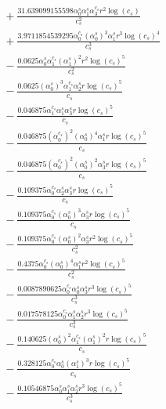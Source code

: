 \documentclass[10pt]{article}
\begin{document}
\begin{align*}
&{}  + \frac{31.639099155598 \alpha_{0}^s \alpha_{1}^s \alpha_{3}^{c_s} r^{2} \log{\left(c_{s} \right)}}{c_{s}^{2}} \\
&{}  + \frac{3.9711854539295 \alpha_{0}^{c_s} \left(\alpha_{0}^s\right)^{3} \alpha_{1}^s r^{3} \log{\left(c_{s} \right)}^{4}}{c_{s}^{3}} \\
&{}  - \frac{0.0625 \alpha_{0}^s \alpha_{1}^{c_s} \left(\alpha_{1}^s\right)^{2} r^{2} \log{\left(c_{s} \right)}^{5}}{c_{s}^{2}} \\
&{}  - \frac{0.0625 \left(\alpha_{0}^s\right)^{3} \alpha_{1}^{c_s} \alpha_{2}^s r \log{\left(c_{s} \right)}^{5}}{c_{s}} \\
&{}  - \frac{0.046875 \alpha_{1}^{c_s} \alpha_{1}^s \alpha_{3}^s r \log{\left(c_{s} \right)}^{5}}{c_{s}} \\
&{}  - \frac{0.046875 \left(\alpha_{0}^{c_s}\right)^{2} \left(\alpha_{0}^s\right)^{4} \alpha_{1}^s r \log{\left(c_{s} \right)}^{5}}{c_{s}} \\
&{}  - \frac{0.046875 \left(\alpha_{0}^{c_s}\right)^{2} \left(\alpha_{0}^s\right)^{2} \alpha_{3}^s r \log{\left(c_{s} \right)}^{5}}{c_{s}} \\
&{}  - \frac{0.109375 \alpha_{0}^{c_s} \alpha_{2}^s \alpha_{3}^s r \log{\left(c_{s} \right)}^{5}}{c_{s}} \\
&{}  - \frac{0.109375 \alpha_{0}^{c_s} \left(\alpha_{0}^s\right)^{3} \alpha_{3}^s r \log{\left(c_{s} \right)}^{5}}{c_{s}} \\
&{}  - \frac{0.109375 \alpha_{0}^{c_s} \left(\alpha_{0}^s\right)^{2} \alpha_{3}^s r^{2} \log{\left(c_{s} \right)}^{5}}{c_{s}^{2}} \\
&{}  - \frac{0.4375 \alpha_{0}^{c_s} \left(\alpha_{0}^s\right)^{4} \alpha_{1}^s r^{2} \log{\left(c_{s} \right)}^{5}}{c_{s}^{2}} \\
&{}  - \frac{0.0087890625 \alpha_{0}^{c_s} \alpha_{0}^s \alpha_{3}^s r^{3} \log{\left(c_{s} \right)}^{5}}{c_{s}^{3}} \\
&{}  - \frac{0.017578125 \alpha_{0}^{c_s} \alpha_{1}^s \alpha_{2}^s r^{3} \log{\left(c_{s} \right)}^{5}}{c_{s}^{3}} \\
&{}  - \frac{0.140625 \left(\alpha_{0}^s\right)^{2} \alpha_{1}^{c_s} \left(\alpha_{1}^s\right)^{2} r \log{\left(c_{s} \right)}^{5}}{c_{s}} \\
&{}  - \frac{0.328125 \alpha_{0}^{c_s} \alpha_{0}^s \left(\alpha_{1}^s\right)^{3} r \log{\left(c_{s} \right)}^{5}}{c_{s}} \\
&{}  - \frac{0.10546875 \alpha_{0}^s \alpha_{1}^s \alpha_{2}^s r^{3} \log{\left(c_{s} \right)}^{5}}{c_{s}^{3}} \\

\end{align*}
\end{document}
